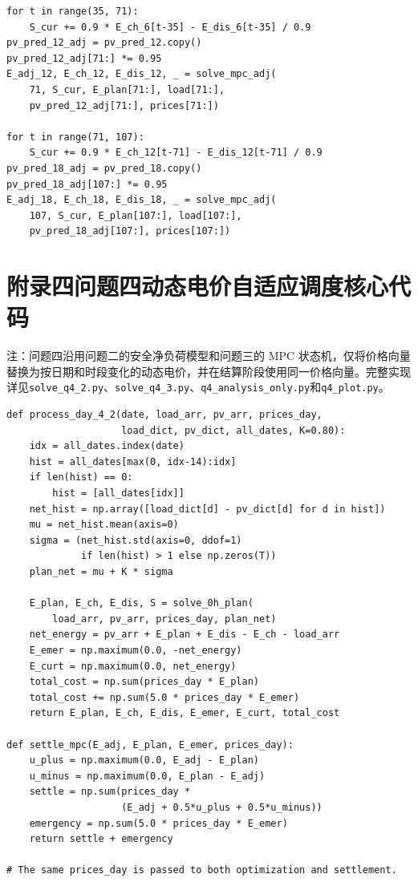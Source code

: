 \documentclass{cumcmthesis}
\begin{document}
\begin{lstlisting}[caption={问题三预测更新与 MPC 滚动核心代码节选},label={lst:q3_core}]
for t in range(35, 71):
    S_cur += 0.9 * E_ch_6[t-35] - E_dis_6[t-35] / 0.9
pv_pred_12_adj = pv_pred_12.copy()
pv_pred_12_adj[71:] *= 0.95
E_adj_12, E_ch_12, E_dis_12, _ = solve_mpc_adj(
    71, S_cur, E_plan[71:], load[71:],
    pv_pred_12_adj[71:], prices[71:])

for t in range(71, 107):
    S_cur += 0.9 * E_ch_12[t-71] - E_dis_12[t-71] / 0.9
pv_pred_18_adj = pv_pred_18.copy()
pv_pred_18_adj[107:] *= 0.95
E_adj_18, E_ch_18, E_dis_18, _ = solve_mpc_adj(
    107, S_cur, E_plan[107:], load[107:],
    pv_pred_18_adj[107:], prices[107:])
\end{lstlisting}

\section*{附录四\quad 问题四动态电价自适应调度核心代码}

注：问题四沿用问题二的安全净负荷模型和问题三的 MPC 状态机，仅将价格向量替换为按日期和时段变化的动态电价，并在结算阶段使用同一价格向量。完整实现详见\texttt{solve\_q4\_2.py}、\texttt{solve\_q4\_3.py}、\texttt{q4\_analysis\_only.py}和\texttt{q4\_plot.py}。

\begin{lstlisting}[caption={问题四动态电价与滚动结算核心代码节选},label={lst:q4_core}]
def process_day_4_2(date, load_arr, pv_arr, prices_day,
                    load_dict, pv_dict, all_dates, K=0.80):
    idx = all_dates.index(date)
    hist = all_dates[max(0, idx-14):idx]
    if len(hist) == 0:
        hist = [all_dates[idx]]
    net_hist = np.array([load_dict[d] - pv_dict[d] for d in hist])
    mu = net_hist.mean(axis=0)
    sigma = (net_hist.std(axis=0, ddof=1)
             if len(hist) > 1 else np.zeros(T))
    plan_net = mu + K * sigma

    E_plan, E_ch, E_dis, S = solve_0h_plan(
        load_arr, pv_arr, prices_day, plan_net)
    net_energy = pv_arr + E_plan + E_dis - E_ch - load_arr
    E_emer = np.maximum(0.0, -net_energy)
    E_curt = np.maximum(0.0, net_energy)
    total_cost = np.sum(prices_day * E_plan)
    total_cost += np.sum(5.0 * prices_day * E_emer)
    return E_plan, E_ch, E_dis, E_emer, E_curt, total_cost

def settle_mpc(E_adj, E_plan, E_emer, prices_day):
    u_plus = np.maximum(0.0, E_adj - E_plan)
    u_minus = np.maximum(0.0, E_plan - E_adj)
    settle = np.sum(prices_day *
                    (E_adj + 0.5*u_plus + 0.5*u_minus))
    emergency = np.sum(5.0 * prices_day * E_emer)
    return settle + emergency

# The same prices_day is passed to both optimization and settlement.
\end{lstlisting}
\end{document}
